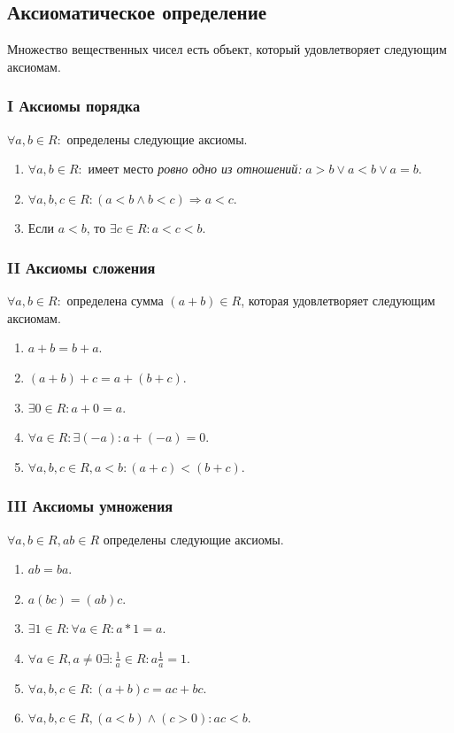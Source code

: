 \documentclass[10pt]{article}
\begin{document}
		\subsection{Аксиоматическое определение}
			Множество вещественных чисел есть объект, который удовлетворяет следующим аксиомам.
			\subsubsection{I Аксиомы порядка}
			$\forall a, b \in R :$ определены следующие аксиомы.
			\begin{enumerate}
				\item $\forall a, b \in R:$ имеет место \textit{ровно одно из отношений:} $a > b \vee a < b \vee a = b$.
				\item $\forall a, b, c \in R : (a < b \wedge b < c) \Rightarrow a < c$.
				\item Если $a < b$, то $\exists c \in R: a < c < b$.
			\end{enumerate}
			\subsubsection{II Аксиомы сложения}
			$\forall a,b \in R:$ определена сумма $(a+b)\in R$, которая удовлетворяет следующим аксиомам.
			\begin{enumerate}
				\item $a + b = b + a$.
				\item $(a + b) + c = a + (b + c)$.
				\item $\exists 0 \in R : a + 0 = a$.
				\item $\forall a\in R : \exists (-a) : a + (-a) = 0$.
				\item $\forall a, b, c \in R, a < b: (a+c) < (b+c)$.
			\end{enumerate}
			\subsubsection{III Аксиомы умножения}
			$\forall a, b \in R, ab \in R$ определены следующие аксиомы.
			\begin{enumerate}
				\item $ab = ba$.
				\item $a(bc) = (ab)c$.
				\item $\exists 1 \in R : \forall a \in R : a*1 = a$.
				\item $\forall a \in R, a \neq 0 \exists : \frac{1}{a} \in R : a\frac{1}{a} = 1$.
				\item $\forall a, b, c \in R : (a+b)c = ac + bc$.
				\item $\forall a, b, c \in R, (a < b) \wedge (c > 0) : ac < b$.
			\end{enumerate}
\end{document}
